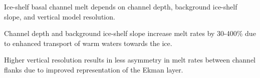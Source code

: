 \documentclass[draft]{agujournal2019}
\begin{document}



\begin{keypoints}
\item Ice-shelf basal channel melt depends on channel depth, background ice-shelf slope, and vertical model resolution.
\item Channel depth and background ice-shelf slope increase melt rates by 30-400\% due to enhanced transport of warm waters towards the ice.
\item Higher vertical resolution results in less asymmetry in melt rates between channel flanks due to improved representation of the Ekman layer.

\end{keypoints}


%
%
\end{document}
